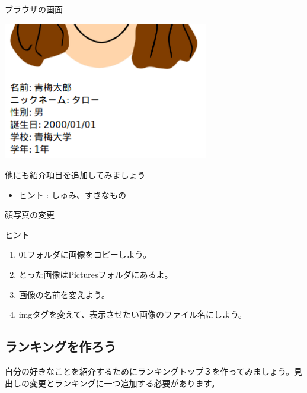 \documentclass[a4paper,12pt]{jarticle}
\begin{document}
\bigskip

\bigskip



ブラウザの画面

\includegraphics[width=9cm,height=6cm]{textbook-img173.png}



\clearpage
{}\theQuestion\label{Q:hasAnswer04-4}

他にも紹介項目を追加してみましょう

\begin{itemize}
  \item ヒント : しゅみ、すきなもの
\end{itemize}
\theQuestion\label{Q:hasAnswer04-5}

顔写真の変更

ヒント

\begin{enumerate}
  \item
        01フォルダに画像をコピーしよう。
  \item とった画像はPicturesフォルダにあるよ。
  \item 画像の名前を変えよう。
  \item
        imgタグを変えて、表示させたい画像のファイル名にしよう。
\end{enumerate}

\bigskip


\bigskip

\clearpage
{}
\subsection{\theExercise ランキングを作ろう}
自分の好きなことを紹介するためにランキングトップ３を作ってみましょう。見出しの変更とランキングに一つ追加する必要があります。
\end{document}

